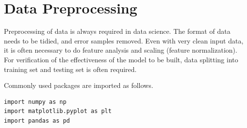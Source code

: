 \section{Data Preprocessing}

Preprocessing of data is always required in data science. The format of data needs to be tidied, and error samples removed. Even with very clean input data, it is often necessary to do feature analysis and scaling (feature normalization). For verification of the effectiveness of the model to be built, data splitting into training set and testing set is often required.

Commonly used packages are imported as follows.
\begin{lstlisting}
import numpy as np
import matplotlib.pyplot as plt
import pandas as pd
\end{lstlisting}